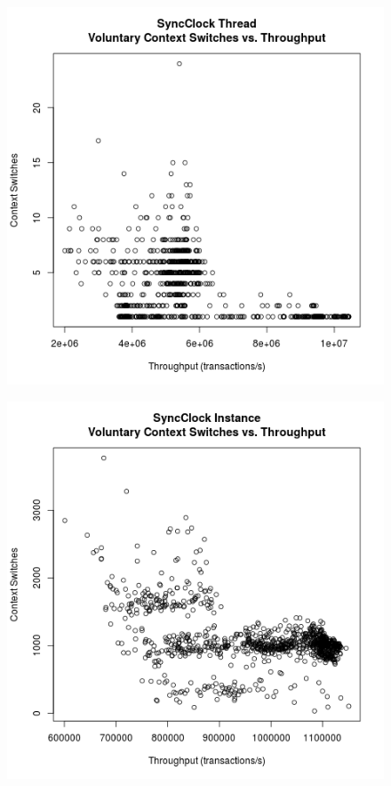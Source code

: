 \clearpage

\begin{figure}
\center
\includegraphics[height=.25\textheight]{sync_thread_throughput_context.png}
\caption{\label{sync_thread_throughput_context}}
\end{figure}

\begin{figure}
\center
\includegraphics[height=.25\textheight]{sync_instance_throughput_context.png}
\caption{\label{sync_instance_throughput_context}}
\end{figure}

